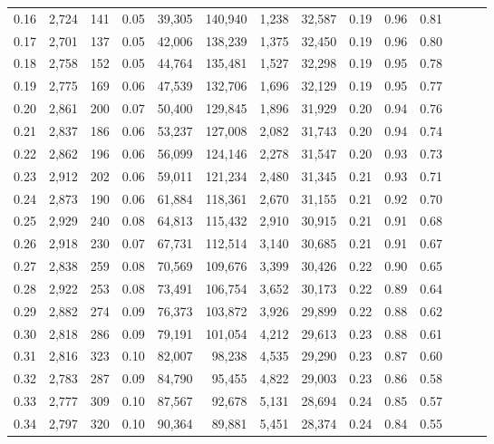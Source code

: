 \begin{tabular}{rrrrrrrrrrrrrr}
0.16 &  2,724 &    141 &  0.05 &   39,305 &  140,940 &   1,238 &  32,587 &  0.19 &  0.96 &      0.81 \\
0.17 &  2,701 &    137 &  0.05 &   42,006 &  138,239 &   1,375 &  32,450 &  0.19 &  0.96 &      0.80 \\
0.18 &  2,758 &    152 &  0.05 &   44,764 &  135,481 &   1,527 &  32,298 &  0.19 &  0.95 &      0.78 \\
0.19 &  2,775 &    169 &  0.06 &   47,539 &  132,706 &   1,696 &  32,129 &  0.19 &  0.95 &      0.77 \\
0.20 &  2,861 &    200 &  0.07 &   50,400 &  129,845 &   1,896 &  31,929 &  0.20 &  0.94 &      0.76 \\
0.21 &  2,837 &    186 &  0.06 &   53,237 &  127,008 &   2,082 &  31,743 &  0.20 &  0.94 &      0.74 \\
0.22 &  2,862 &    196 &  0.06 &   56,099 &  124,146 &   2,278 &  31,547 &  0.20 &  0.93 &      0.73 \\
0.23 &  2,912 &    202 &  0.06 &   59,011 &  121,234 &   2,480 &  31,345 &  0.21 &  0.93 &      0.71 \\
0.24 &  2,873 &    190 &  0.06 &   61,884 &  118,361 &   2,670 &  31,155 &  0.21 &  0.92 &      0.70 \\
0.25 &  2,929 &    240 &  0.08 &   64,813 &  115,432 &   2,910 &  30,915 &  0.21 &  0.91 &      0.68 \\
0.26 &  2,918 &    230 &  0.07 &   67,731 &  112,514 &   3,140 &  30,685 &  0.21 &  0.91 &      0.67 \\
0.27 &  2,838 &    259 &  0.08 &   70,569 &  109,676 &   3,399 &  30,426 &  0.22 &  0.90 &      0.65 \\
0.28 &  2,922 &    253 &  0.08 &   73,491 &  106,754 &   3,652 &  30,173 &  0.22 &  0.89 &      0.64 \\
0.29 &  2,882 &    274 &  0.09 &   76,373 &  103,872 &   3,926 &  29,899 &  0.22 &  0.88 &      0.62 \\
0.30 &  2,818 &    286 &  0.09 &   79,191 &  101,054 &   4,212 &  29,613 &  0.23 &  0.88 &      0.61 \\
0.31 &  2,816 &    323 &  0.10 &   82,007 &   98,238 &   4,535 &  29,290 &  0.23 &  0.87 &      0.60 \\
0.32 &  2,783 &    287 &  0.09 &   84,790 &   95,455 &   4,822 &  29,003 &  0.23 &  0.86 &      0.58 \\
0.33 &  2,777 &    309 &  0.10 &   87,567 &   92,678 &   5,131 &  28,694 &  0.24 &  0.85 &      0.57 \\
0.34 &  2,797 &    320 &  0.10 &   90,364 &   89,881 &   5,451 &  28,374 &  0.24 &  0.84 &      0.55 \\

\end{tabular}
